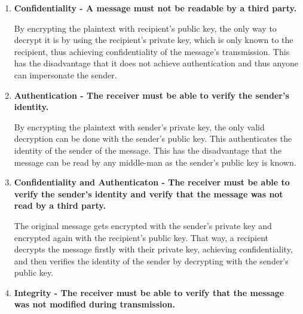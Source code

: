 \begin{enumerate}
    \item \textbf{Confidentiality - A message must not be readable by a third party.} 
    
    By encrypting the plaintext with recipient's public key, the only way to decrypt it is by using the recipient's private key, which is only known to the recipient, thus achieving confidentiality of the message's transmission. This has the disadvantage that it does not achieve authentication and thus anyone can impersonate the sender.

    \item \textbf{Authentication - The receiver must be able to verify the sender's identity.} 
    
    By encrypting the plaintext with sender's private key, the only valid decryption can be done with the sender's public key. This authenticates the identity of the sender of the message. This has the disadvantage that the message can be read by any middle-man as the sender's public key is known.
    
    \item \textbf{Confidentiality and Authenticaton - The receiver must be able to verify the sender's identity and verify that the message was not read by a third party.} 
    
    The original message gets encrypted with the sender's private key and encrypted again with the recipient's public key. That way, a recipient decrypts the message firstly with their private key, achieving confidentiality, and then verifies the identity of the sender by decrypting with the sender's public key.
    \item \textbf{Integrity - The receiver must be able to verify that the message was not modified during transmission.} 
    

\end{enumerate}
